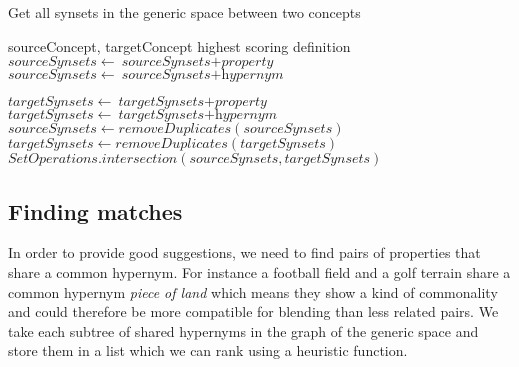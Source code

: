 \begin{algorithm}
	\caption{Get all synsets in the generic space between two concepts}\label{euclid}
	\begin{algorithmic}[1]
		\Require sourceConcept,
		targetConcept
		\Ensure highest scoring definition
		\State ${\textit{sourceSynsets} \gets {\textit{sourceSynsets} + \textit{property}}}$
		\State ${\textit{sourceSynsets} \gets {\textit{sourceSynsets} + \textit{hypernym}}}$
		\EndFor
		\EndFor
		
		\State ${\textit{targetSynsets} \gets {\textit{targetSynsets} + \textit{property}}}$
		\State ${\textit{targetSynsets} \gets {\textit{targetSynsets} + \textit{hypernym}}}$
		\EndFor
		\EndFor
		\State ${\textit{sourceSynsets} \gets {removeDuplicates(\textit{sourceSynsets})}}$
		\State ${\textit{targetSynsets} \gets {removeDuplicates(\textit{targetSynsets})}}$
		\State \Return ${SetOperations.intersection(\textit{sourceSynsets}, \textit{targetSynsets})}$
		\EndProcedure
	\end{algorithmic}
\end{algorithm}

\subsection{Finding matches}
In order to provide good suggestions, we need to find pairs of properties that share a common hypernym. For instance a football field and a golf terrain share a common hypernym \emph{piece of land} which means they show a kind of commonality and could therefore be more compatible for blending than less related pairs. We take each subtree of shared hypernyms in the graph of the generic space and store them in a list which we can rank using a heuristic function.

